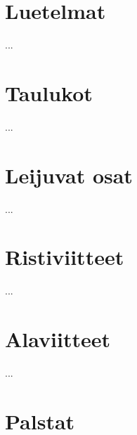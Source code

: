 



\section{Luetelmat}
\label{luku:luetelmat}

...

\section{Taulukot}
\label{luku:taulukot}

...


\section{Leijuvat osat}
\label{luku:leijuosat}

...

\section{Ristiviitteet}
\label{luku:ristiviitteet}

...

\section{Alaviitteet}
\label{luku:alaviitteet}

...



\section{Palstat}
\label{luku:palstat}

